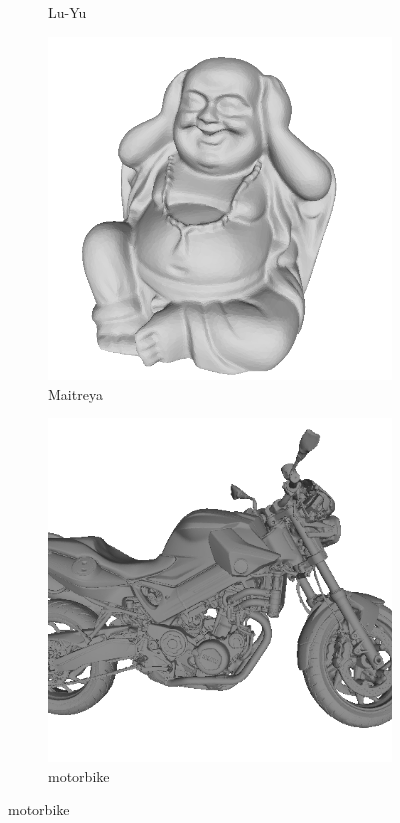 \begin{figure}[!h]
\begin{subfigure}[b]{0.23\linewidth}
		\caption{Lu-Yu}
	\end{subfigure}
	\begin{subfigure}[b]{0.23\linewidth}
		\includegraphics[width=\linewidth]{./Figures/train-dataset/30.maitreya.png}
		\caption{Maitreya}
	\end{subfigure}
	\begin{subfigure}[b]{0.23\linewidth}
		\includegraphics[width=\linewidth]{./Figures/train-dataset/31.motorbike.png}
		\caption{motorbike}
	\end{subfigure}
	

\end{figure}
